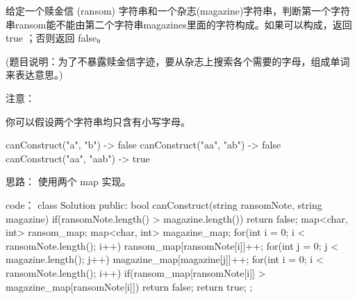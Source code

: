 给定一个赎金信 (ransom) 字符串和一个杂志(magazine)字符串，判断第一个字符串ransom能不能由第二个字符串magazines里面的字符构成。如果可以构成，返回 true ；否则返回 false。

(题目说明：为了不暴露赎金信字迹，要从杂志上搜索各个需要的字母，组成单词来表达意思。)

注意：

你可以假设两个字符串均只含有小写字母。

canConstruct("a", "b") -> false
canConstruct("aa", "ab") -> false
canConstruct("aa", "aab") -> true
























思路：
使用两个 map 实现。






















code：
class Solution {
public:
    bool canConstruct(string ransomNote, string magazine) {
        if(ransomNote.length() > magazine.length())
            return false;
        map<char, int> ransom_map;
        map<char, int> magazine_map;
        for(int i = 0; i < ransomNote.length(); i++)
        {
            ransom_map[ransomNote[i]]++;
        }
        for(int j = 0; j < magazine.length(); j++)
            magazine_map[magazine[j]]++;
        for(int i = 0; i < ransomNote.length(); i++)
        {
            if(ransom_map[ransomNote[i]] > magazine_map[ransomNote[i]])
                return false;
        }
        return true;
    }
};